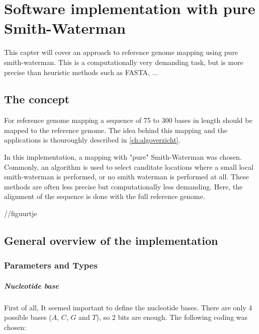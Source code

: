
\chapter{Software implementation with pure Smith-Waterman}

This capter will cover an approach to reference genome mapping using pure smith-waterman. This is a computationally very demanding task, but is more precise than heuristic methods such as FASTA, ...

\section{The concept}
For reference genome mapping a sequence of 75 to 300 bases in length should be mapped to the reference genome. The idea behind this mapping and the applications is thouroughly described in \ref{ch:algoverzicht}.

In this implementation, a mapping with "pure" Smith-Waterman was chosen. Commonly, an algorithm is used to select canditate locations where a small local smith-waterman is performed, or no smith waterman is performed at all. These methods are often less precise but computationally less demanding. Here, the alignment of the sequence is done with the full reference genome.

 //figuurtje


\section{General overview of the implementation}

\subsection{Parameters and Types}

\paragraph{Nucleotide base}
First of all, It seemed important to define the nucleotide bases. There are only 4 possible bases ($A$, $C$, $G$ and $T$), so 2 bits are enough. The following coding was chosen:

